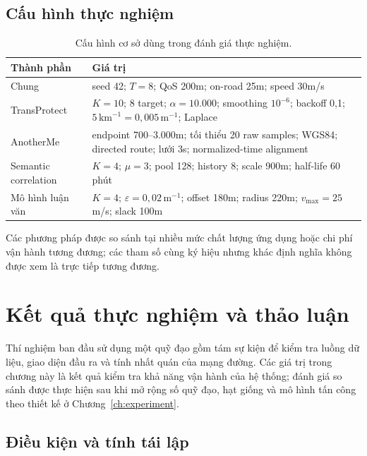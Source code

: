 \documentclass[12pt,a4paper,oneside]{report}
\begin{document}
\section{Cấu hình thực nghiệm}

\begin{table}[htbp]
\centering
\footnotesize
\caption{Cấu hình cơ sở dùng trong đánh giá thực nghiệm.}
\label{tab:canonical-config}
\begin{tabularx}{\textwidth}{P{4.1cm}Y}
\toprule
\textbf{Thành phần} & \textbf{Giá trị} \\
\midrule
Chung & seed 42; $T=8$; QoS 200m; on-road 25m; speed 30m/s \\
TransProtect & $K=10$; 8 target; $\alpha=10.000$; smoothing $10^{-6}$; backoff 0,1; $5\,\mathrm{km}^{-1}=0{,}005\,\mathrm{m}^{-1}$; Laplace \\
AnotherMe & endpoint 700--3.000m; tối thiểu 20 raw samples; WGS84; directed route; lưới 3s; normalized-time alignment \\
Semantic correlation & $K=4$; $\mu=3$; pool 128; history 8; scale 900m; half-life 60 phút \\
Mô hình luận văn & $K=4$; $\varepsilon=0{,}02\,\mathrm{m}^{-1}$; offset 180m; radius 220m; $v_{\max}=25$m/s; slack 100m \\
\bottomrule
\end{tabularx}
\end{table}

Các phương pháp được so sánh tại nhiều mức chất lượng ứng dụng hoặc chi phí vận hành tương đương; các tham số cùng ký hiệu nhưng khác định nghĩa không được xem là trực tiếp tương đương.

\chapter{Kết quả thực nghiệm và thảo luận}
\label{ch:results}

Thí nghiệm ban đầu sử dụng một quỹ đạo gồm tám sự kiện để kiểm tra luồng dữ liệu, giao diện đầu ra và tính nhất quán của mạng đường. Các giá trị trong chương này là kết quả kiểm tra khả năng vận hành của hệ thống; đánh giá so sánh được thực hiện sau khi mở rộng số quỹ đạo, hạt giống và mô hình tấn công theo thiết kế ở Chương~\ref{ch:experiment}.

\section{Điều kiện và tính tái lập}
\end{document}
